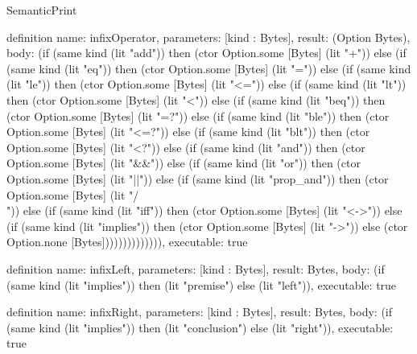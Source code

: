 \begin{lexlean}{SemanticPrint}
\begin{semanticmodule}
definition{
  name: infixOperator,
  parameters: [kind : Bytes],
  result: (Option Bytes),
  body: (if (same kind (lit "add")) then (ctor Option.some [Bytes] (lit "+")) else (if (same kind (lit "eq")) then (ctor Option.some [Bytes] (lit "=")) else (if (same kind (lit "le")) then (ctor Option.some [Bytes] (lit "<=")) else (if (same kind (lit "lt")) then (ctor Option.some [Bytes] (lit "<")) else (if (same kind (lit "beq")) then (ctor Option.some [Bytes] (lit "=?")) else (if (same kind (lit "ble")) then (ctor Option.some [Bytes] (lit "<=?")) else (if (same kind (lit "blt")) then (ctor Option.some [Bytes] (lit "<?")) else (if (same kind (lit "and")) then (ctor Option.some [Bytes] (lit "&&")) else (if (same kind (lit "or")) then (ctor Option.some [Bytes] (lit "||")) else (if (same kind (lit "prop_and")) then (ctor Option.some [Bytes] (lit "/\\")) else (if (same kind (lit "iff")) then (ctor Option.some [Bytes] (lit "<->")) else (if (same kind (lit "implies")) then (ctor Option.some [Bytes] (lit "->")) else (ctor Option.none [Bytes]))))))))))))),
  executable: true
}

definition{
  name: infixLeft,
  parameters: [kind : Bytes],
  result: Bytes,
  body: (if (same kind (lit "implies")) then (lit "premise") else (lit "left")),
  executable: true
}

definition{
  name: infixRight,
  parameters: [kind : Bytes],
  result: Bytes,
  body: (if (same kind (lit "implies")) then (lit "conclusion") else (lit "right")),
  executable: true
}


\end{semanticmodule}
\end{lexlean}
